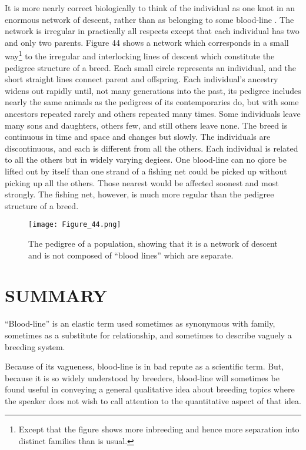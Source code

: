 It is more nearly correct biologically to think of the individual as
one knot in an enormous network of descent, rather than as belonging
to some blood-line . The network is irregular in practically all respects
except that each individual has two and only two parents. Figure 44
shows a network which corresponds in a small way\footnote{Except that the
figure shows more inbreeding and hence more separation into
distinct families than is usual.} to the irregular and
interlocking lines of descent which constitute the pedigree structure of
a breed. Each small circle represents an individual, and the short
straight lines connect parent and offspring. Each individual's ancestry
widens out rapidly until, not many generations into the past, its
pedigree includes nearly the same animals as the pedigrees of its contemporaries
do, but with some ancestors repeated rarely and others repeated
many times. Some individuals leave many sons and daughters, others
few, and still others leave none. The breed is continuous in time and
space and changes but slowly. The individuals are discontinuous, and
each is different from all the others. Each individual is related to all the
others but in widely varying degiees. One blood-line can no qiore be
lifted out by itself than one strand of a fishing net could be picked up
without picking up all the others. Those nearest would be affected
soonest and most strongly. The fishing net, however, is much more regular
than the pedigree structure of a breed.

\begin{figure}
	\centering
    \texttt{[image: Figure\_44.png]}
    \caption{The pedigree of a population, showing that it is a network of descent
			 and is not composed of ``blood lines'' which are separate.}
    \label{fig:Lush_Figure_44}
\end{figure}

\section*{SUMMARY}

``Blood-line'' is an elastic term used sometimes as synonymous with
family, sometimes as a substitute for relationship, and sometimes to
describe vaguely a breeding system.

Because of its vagueness, blood-line is in bad repute as a scientific
term. But, because it is so widely understood by breeders, blood-line
will sometimes be found useful in conveying a general qualitative idea
about breeding topics where the speaker does not wish to call attention
to the quantitative aspect of that idea.

